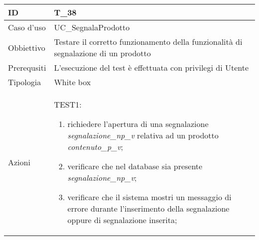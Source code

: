 \begin{table}[hb]
    \centering
    \begin{tabular}{ |p{2cm}|p{10cm}|  }
        \hline
        ID          & T\_38                                                                              \\\hline
        Caso d'uso  & UC\_SegnalaProdotto                                                           \\\hline
        Obbiettivo  & Testare il corretto funzionamento della funzionalità di segnalazione di un prodotto \\\hline
        Prerequsiti & L'esecuzione del test è effettuata con privilegi di Utente                         \\\hline
        Tipologia   & White box                                                                          \\\hline
        Azioni      &
        TEST1:
        \begin{enumerate}[nosep, topsep=0pt]
            \item richiedere l'apertura di una segnalazione \emph{segnalazione\_np\_v} relativa ad un prodotto \emph{contenuto\_p\_v};
            \item verificare che nel database sia presente \emph{segnalazione\_np\_v};
            \item verificare che il sistema mostri un messaggio di errore durante l'inserimento della segnalazione oppure di segnalazione inserita;
        \end{enumerate}
        \\\hline
    \end{tabular}
\end{table}

